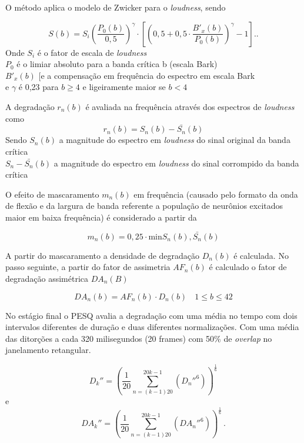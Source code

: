 O método aplica o modelo de Zwicker para o \textit{loudness}, sendo

\begin{equation}
S(b) = S_i \left(\dfrac{P_0(b)}{0,5}\right)^{\gamma} \cdot \left[ \left(0,5 + 0,5 \cdot \dfrac{B'_x(b)}{P_0(b)}\right)^{\gamma} -1\right]..
\end{equation}
\noindent
Onde
$S_i$ é o fator de escala de \textit{loudness}\\
$P_0$ é o limiar absoluto para a banda crítica b (escala Bark)\\
$B'_x(b)$ [e a compensação em frequência do espectro em escala Bark\\
e $\gamma$ é 0,23 para $b \geq 4$ e ligeiramente maior se $b < 4$

A degradação $r_n(b)$ é avaliada na frequência através dos espectros de \textit{loudness} como
\begin{equation}
r_n(b) = S_n(b)-\bar{S_n}(b)
\end{equation}
\noindent
Sendo 
$S_n(b)$ a magnitude do espectro em \textit{loudness} do sinal original da banda crítica\\
$S_n-\bar{S_n}(b)$ a magnitude do espectro em \textit{loudness} do sinal corrompido da banda crítica

O efeito de mascaramento $m_n(b)$ em frequência (causado pelo formato da onda de flexão e da largura de banda referente a população de neurônios excitados maior em baixa frequência) é considerado a partir da 

\begin{equation}
m_n(b) = 0,25\cdot\text{min}{S_n(b),\bar{S_n}(b)}
\label{masc}
\end{equation}

A partir do mascaramento a densidade de degradação $D_n(b)$ é calculada. No passo seguinte, a partir do fator de assimetria $AF_n(b)$ é calculado o fator de degradação assimétrica $DA_n(B)$

$$DA_n(b) = AF_n(b)\cdot D_n(b) \ \ \,\,\, 1\leq b\leq 42 $$

No estágio final o PESQ avalia a degradação com uma média no tempo com dois intervalos diferentes de duração e duas diferentes normalizações. Com uma média das ditorções a cada 320 milisegundos (20 frames) com 50\% de \textit{overlap} no janelamento retangular.

\begin{equation}
D_k'' = \left(\dfrac{1}{20}\sum\limits_{n=(k-1)20}^{20k-1}(D_n''^6)\right)^{\frac{1}{6}}
\end{equation}
\noindent
e 
\begin{equation}
DA_k'' = \left(\dfrac{1}{20}\sum\limits_{n=(k-1)20}^{20k-1}(DA_n''^6)\right)^{\frac{1}{6}} \,.
\end{equation}


